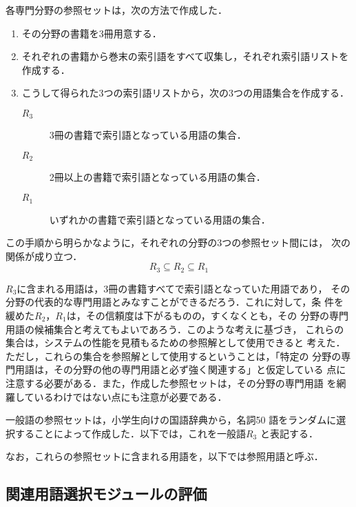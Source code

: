 各専門分野の参照セットは，次の方法で作成した．
\begin{enumerate}
\item その分野の書籍を3冊用意する．
\item それぞれの書籍から巻末の索引語をすべて収集し，それぞれ索引語リストを作成する．
\item こうして得られた3つの索引語リストから，次の3つの用語集合を作成する．
\begin{description}
\item[$R_3$] 3冊の書籍で索引語となっている用語の集合．
\item[$R_2$] 2冊以上の書籍で索引語となっている用語の集合．
\item[$R_1$] いずれかの書籍で索引語となっている用語の集合．
\end{description}
\end{enumerate}
この手順から明らかなように，それぞれの分野の3つの参照セット間には，
次の関係が成り立つ．
\begin{equation}
R_3 \subseteq R_2 \subseteq R_1
\end{equation}

$R_3$に含まれる用語は，3冊の書籍すべてで索引語となっていた用語であり，
その分野の代表的な専門用語とみなすことができるだろう．これに対して，条
件を緩めた$R_2$，$R_1$は，その信頼度は下がるものの，すくなくとも，その
分野の専門用語の候補集合と考えてもよいであろう．このような考えに基づき，
これらの集合は，システムの性能を見積もるための参照解として使用できると
考えた．ただし，これらの集合を参照解として使用するということは，「特定の
分野の専門用語は，その分野の他の専門用語と必ず強く関連する」と仮定している
点に注意する必要がある．また，作成した参照セットは，その分野の専門用語
を網羅しているわけではない点にも注意が必要である．

一般語の参照セットは，小学生向けの国語辞典\cite{RSK}から，名詞50
語をランダムに選択することによって作成した．以下では，これを一般語$R_3$
と表記する．

なお，これらの参照セットに含まれる用語を，以下では参照用語と呼ぶ．


\subsection{関連用語選択モジュールの評価}\label{sec:ex_rel}

